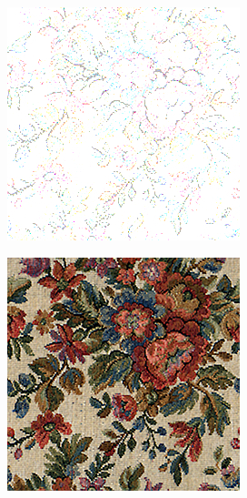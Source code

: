 \begin{figure}[]
\begin{subfigure}{\textwidth}
\begin{subfigure}{0.24\textwidth}
            \caption*{}
        \end{subfigure}
        \hfill
        \begin{subfigure}{0.24\textwidth}
            \centering
            \includegraphics[width=\textwidth]{images/04-experiment01/flowers/1000/flowers_im.jpg}
            \caption*{}
        \end{subfigure}
        \hfill
        \begin{subfigure}{0.24\textwidth}
            \centering
            \includegraphics[width=\textwidth]{images/04-experiment01/flowers/1000/flowers_proj.jpg}
            \caption*{}
        \end{subfigure}


\end{subfigure}
\end{figure}
